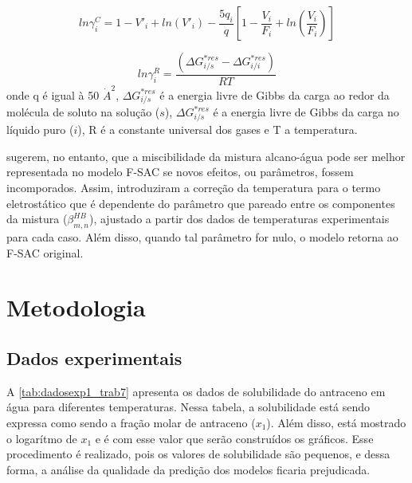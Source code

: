 \begin{equation}\label{eq:013} 
ln\gamma_i^C = 1 - V'_i + ln(V'_i) - \frac{5q_i}{q}\left [ 1 
- \frac{V_i}{F_i} + ln\left ( \frac{V_i}{F_i} \right ) \right ] 
\end{equation}

\begin{equation}\label{eq:014} 
ln\gamma_i^R = \frac{\left( \Delta G_{i/s}^{*res} - \Delta
G_{i/i}^{*res} \right)}{RT}
\end{equation}
onde q é igual à 50 $\dot{A}^2$, $\Delta G_{i/s}^{*res}$ é a energia livre 
de Gibbs da carga ao redor da molécula de soluto na solução ($s$), 
$\Delta G_{i/s}^{*res}$ é a energia livre de Gibbs da carga no 
líquido puro ($i$), R é a constante universal dos gases e T a temperatura.

 sugerem, no entanto, que a miscibilidade 
da mistura alcano-água pode ser melhor representada no modelo F-SAC 
se novos efeitos, ou parâmetros, fossem incomporados. Assim, 
 introduziram a correção da temperatura 
para o termo eletrostático que é dependente do parâmetro que 
pareado entre os componentes da mistura ($\beta_{m,n}^{HB}$), 
ajustado a partir dos dados de temperaturas experimentais 
para cada caso. Além disso, quando tal parâmetro for nulo, 
o modelo retorna ao F-SAC original.

\section{Metodologia}

\subsection{Dados experimentais}

A \autoref{tab:dadosexp1_trab7} apresenta os dados de solubilidade do antraceno
em água para diferentes temperaturas. Nessa tabela, a solubilidade está sendo
expressa como sendo a fração molar de antraceno ($x_1$). Além disso, está
mostrado o logarítmo de $x_1$ e é com esse valor que serão construídos os
gráficos. Esse procedimento é realizado, pois os valores de solubilidade são
pequenos, e dessa forma, a análise da qualidade da predição dos modelos ficaria
prejudicada.

\clearpage


